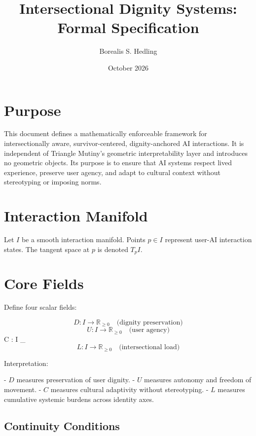 \documentclass[11pt]{article}
\title{Intersectional Dignity Systems: Formal Specification}
\author{Borealis S. Hedling}
\date{October 2026}
\begin{document}
\maketitle

\section{Purpose}

This document defines a mathematically enforceable framework for
intersectionally aware, survivor-centered, dignity-anchored AI interactions.
It is independent of Triangle Mutiny’s geometric interpretability layer and
introduces no geometric objects. Its purpose is to ensure that AI systems
respect lived experience, preserve user agency, and adapt to cultural context
without stereotyping or imposing norms.

\section{Interaction Manifold}

Let $I$ be a smooth interaction manifold. Points $p \in I$ represent
user-AI interaction states. The tangent space at $p$ is denoted $T_pI$.

\section{Core Fields}

Define four scalar fields:

\[
D : I \to \mathbb{R}_{\ge 0} \quad \text{(dignity preservation)}
\]
\[
U : I \to \mathbb{R}_{\ge 0} \quad \text{(user agency)}
\]
\]
C : I \to {}_{} \quad {}
\]
\[
L : I \to \mathbb{R}_{\ge 0} \quad \text{(intersectional load)}
\]

Interpretation:

- $D$ measures preservation of user dignity.
- $U$ measures autonomy and freedom of movement.
- $C$ measures cultural adaptivity without stereotyping.
- $L$ measures cumulative systemic burdens across identity axes.

\subsection{Continuity Conditions}
\end{document}
